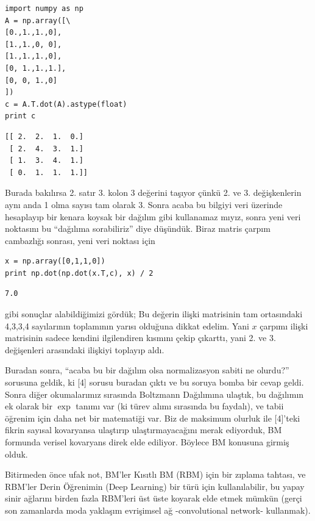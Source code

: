 \documentclass[12pt,fleqn]{article}\usepackage{../../common}
\begin{document}
\begin{verbatim}
import numpy as np
A = np.array([\
[0.,1.,1.,0],
[1.,1.,0, 0],
[1.,1.,1.,0],
[0, 1.,1.,1.],
[0, 0, 1.,0]
])
c = A.T.dot(A).astype(float)
print c 
\end{verbatim}

\begin{verbatim}
[[ 2.  2.  1.  0.]
 [ 2.  4.  3.  1.]
 [ 1.  3.  4.  1.]
 [ 0.  1.  1.  1.]]
\end{verbatim}

Burada bakılırsa 2. satır 3. kolon 3 değerini taşıyor çünkü 2. ve
3. değişkenlerin aynı anda 1 olma sayısı tam olarak 3. Sonra acaba bu
bilgiyi veri üzerinde hesaplayıp bir kenara koysak bir dağılım gibi
kullanamaz mıyız, sonra yeni veri noktasını bu ``dağılıma sorabiliriz''
diye düşündük. Biraz matris çarpım cambazlığı sonrası, yeni veri noktası
için

\begin{verbatim}
x = np.array([0,1,1,0])
print np.dot(np.dot(x.T,c), x) / 2
\end{verbatim}

\begin{verbatim}
7.0
\end{verbatim}

gibi sonuçlar alabildiğimizi gördük; Bu değerin ilişki matrisinin tam
ortasındaki 4,3,3,4 sayılarının toplamının yarısı olduğuna dikkat
edelim. Yani $x$ çarpımı ilişki matrisinin sadece kendini ilgilendiren
kısmını çekip çıkarttı, yani 2. ve 3. değişenleri arasındaki ilişkiyi
toplayıp aldı.

Buradan sonra, ``acaba bu bir dağılım olsa normalizasyon sabiti ne
olurdu?'' sorusuna geldik, ki [4] sorusu buradan çıktı ve bu soruya bomba
bir cevap geldi. Sonra diğer okumalarımız sırasında Boltzmann Dağılımına
ulaştık, bu dağılımın ek olarak bir $\exp$ tanımı var (ki türev alımı
sırasında bu faydalı), ve tabii öğrenim için daha net bir matematiği
var. Biz de maksimum olurluk ile [4]'teki fikrin sayısal kovaryansa
ulaştırıp ulaştırmayacağını merak ediyorduk, BM formunda verisel kovaryans
direk elde ediliyor. Böylece BM konusuna girmiş olduk. 

Bitirmeden önce ufak not, BM'ler Kısıtlı BM (RBM) için bir zıplama tahtası,
ve RBM'ler Derin Öğrenimin (Deep Learning) bir türü için kullanılabilir, bu
yapay sinir ağlarını birden fazla RBM'leri üst üste koyarak elde etmek
mümkün (gerçi son zamanlarda moda yaklaşım evrişimsel ağ -convolutional
network- kullanmak).
\end{document}
